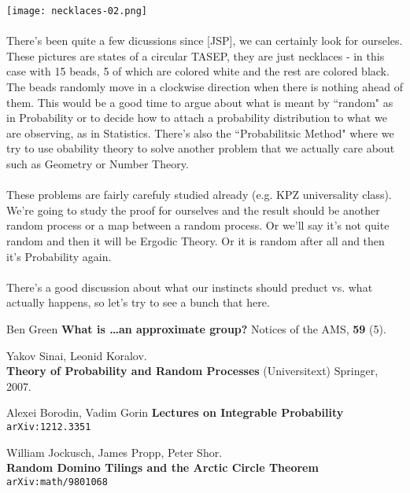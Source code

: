 \documentclass[12pt]{article}
\begin{document}
\texttt{[image: necklaces-02.png]} \\ \\
There's been quite a few dicussions since [JSP], we can certainly look for ourseles.  These pictures are states of a circular TASEP, they are just necklaces - in this case with 15 beads, 5 of which are colored white and the rest are colored black.  The beads randomly move in a clockwise direction when there is nothing ahead of them. 
\newpage \noindent 
This would be a good time to argue about what is meant by ``random" as in Probability or to decide how to attach a probability distribution to what we are observing, as in Statistics.  There's also the ``Probabilitsic Method" where we try to use obability theory to solve another problem that we actually care about such as Geometry or Number Theory. \\ \\
These problems are fairly carefuly studied already (e.g. KPZ universality class). We're going to study the proof for ourselves and the result should be another random process or a map between a random process.  Or we'll say it's not quite random and then it will be Ergodic Theory.  Or it is random after all and then it's Probability again. \\ \\
There's a good discussion about what our instincts should preduct vs. what actually happens, so let's try to see a bunch that here.

\vfill

\begin{thebibliography}{}

\item Ben Green \textbf{What is \dots an approximate group?} Notices of the AMS, \textbf{59} (5).
\item Yakov Sinai, Leonid Koralov. \\ \textbf{Theory of Probability and Random Processes} (Universitext) Springer, 2007.
\item Alexei Borodin, Vadim Gorin \textbf{Lectures on Integrable Probability} \texttt{arXiv:1212.3351}
\item William Jockusch, James Propp, Peter Shor. \\\textbf{Random Domino Tilings and the Arctic Circle Theorem} \texttt{arXiv:math/9801068}

\end{thebibliography} 
\end{document}

